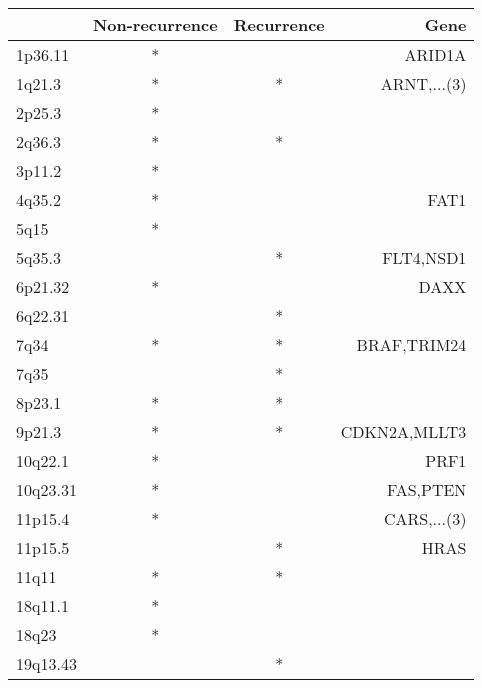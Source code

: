 \begin{tabular}{lccr}
\toprule
{} & Non-recurrence & Recurrence &          Gene \\
\midrule
1p36.11  &              * &            &        ARID1A \\
1q21.3   &              * &          * &   ARNT,...(3) \\
2p25.3   &              * &            &               \\
2q36.3   &              * &          * &               \\
3p11.2   &              * &            &               \\
4q35.2   &              * &            &          FAT1 \\
5q15     &              * &            &               \\
5q35.3   &                &          * &     FLT4,NSD1 \\
6p21.32  &              * &            &          DAXX \\
6q22.31  &                &          * &               \\
7q34     &              * &          * &   BRAF,TRIM24 \\
7q35     &                &          * &               \\
8p23.1   &              * &          * &               \\
9p21.3   &              * &          * &  CDKN2A,MLLT3 \\
10q22.1  &              * &            &          PRF1 \\
10q23.31 &              * &            &      FAS,PTEN \\
11p15.4  &              * &            &   CARS,...(3) \\
11p15.5  &                &          * &          HRAS \\
11q11    &              * &          * &               \\
18q11.1  &              * &            &               \\
18q23    &              * &            &               \\
19q13.43 &                &          * &               \\
\bottomrule
\end{tabular}
